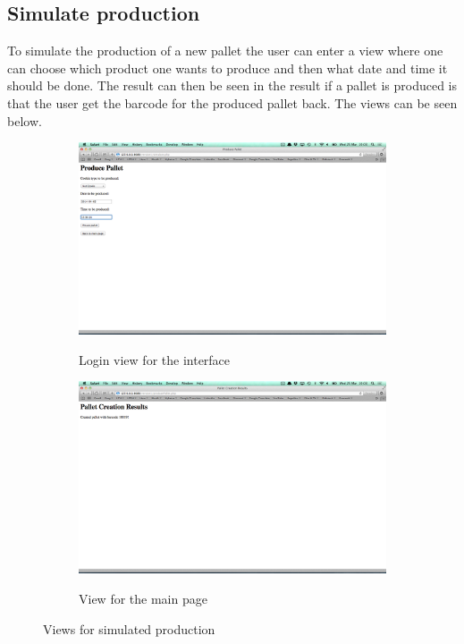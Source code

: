 \documentclass[a4paper]{scrartcl}
\numberwithin{equation}{section}
\begin{document}
\subsection*{Simulate production}

To simulate the production of a new pallet the user can enter a view where one can choose which product one wants to produce and then what date and time it should be done. The result can then be seen in the result if a pallet is produced is that the user get the barcode for the produced pallet back. The views can be seen below.

\begin{figure}[h]
  \centering
  	\begin{subfigure}[b]{0.45\textwidth}
    	\includegraphics[width=\textwidth]{figures/view_produce.png}
    	\label{figure:view_produce}
    	\caption{Login view for the interface}
 		\end{subfigure}	
 		\begin{subfigure}[b]{0.45\textwidth}
    	\includegraphics[width=\textwidth]{figures/view_produceResult.png}
    	\label{figure:view_produceResult}
    	\caption{View for the main page}
 		\end{subfigure} 
 		\caption{Views for simulated production}
\end{figure}
\end{document}
